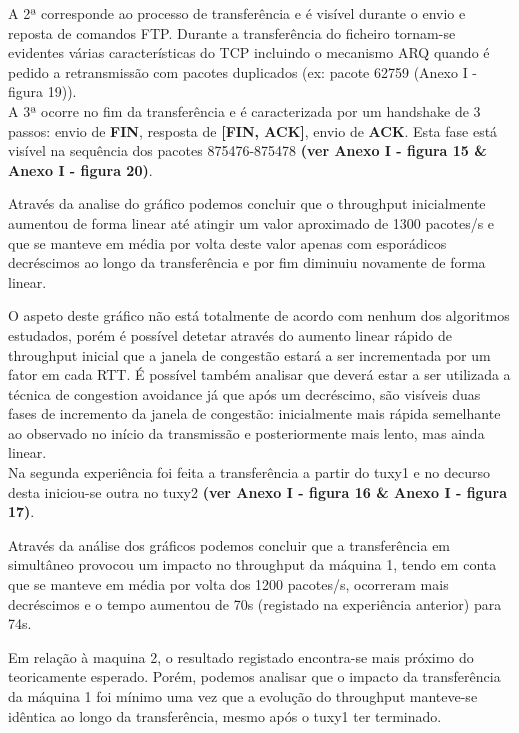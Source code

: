 \documentclass[a4paper, 11pt]{article}
\begin{document}
A 2ª corresponde ao processo de transferência e é visível durante o envio e reposta de comandos FTP. Durante a transferência do ficheiro tornam-se evidentes várias características do TCP incluindo o mecanismo ARQ quando é pedido a retransmissão com pacotes duplicados (ex: pacote 62759  (Anexo I - figura 19)).\\

A 3ª ocorre no fim da transferência e é caracterizada por um handshake de 3 passos: envio de \textbf{ FIN}, resposta de \textbf{[FIN, ACK]}, envio de \textbf{ACK}. Esta fase está visível na sequência dos pacotes 875476-875478 \textbf{(ver Anexo I - figura 15 \& Anexo I - figura 20)}.

Através da analise do gráfico podemos concluir que o throughput inicialmente aumentou de forma linear até atingir um valor aproximado de 1300 pacotes/s e que se manteve em média por volta deste valor apenas com esporádicos decréscimos ao longo da transferência e por fim diminuiu novamente de forma linear.

O aspeto deste gráfico não está totalmente de acordo com nenhum dos algoritmos estudados, porém é possível detetar através do aumento linear rápido de throughput inicial que a janela de congestão estará a ser incrementada por um fator em cada RTT. 
É possível também analisar que deverá estar a ser utilizada a técnica de congestion avoidance já que após um decréscimo, são visíveis duas fases de incremento da janela de congestão: inicialmente mais rápida semelhante ao observado no início da transmissão e posteriormente mais lento, mas ainda linear.\\

Na segunda experiência foi feita a transferência a partir do tuxy1 e no decurso desta iniciou-se outra no tuxy2 \textbf{(ver Anexo I - figura 16 \& Anexo I - figura 17)}.

Através da análise dos gráficos podemos concluir que a transferência em simultâneo provocou um impacto no throughput da máquina 1, tendo em conta que se manteve em média por volta dos 1200 pacotes/s, ocorreram mais decréscimos e o tempo aumentou de 70s (registado na experiência anterior) para 74s.

Em relação à maquina 2, o resultado registado encontra-se mais próximo do teoricamente esperado. Porém, podemos analisar que o impacto da transferência da máquina 1 foi mínimo uma vez que a evolução do throughput manteve-se idêntica ao longo da transferência, mesmo após o tuxy1 ter terminado. 

\end{document}

